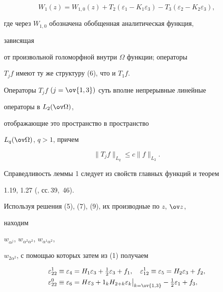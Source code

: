 \begin{equation} 


W_1(z)=W_{1,0}(z)+T_2(\varepsilon_1-K_1\varepsilon_3)-T_3 


(\varepsilon_2-K_2\varepsilon_3), 


\end{equation} 


где через $W_{1,0}$ обозначена обобщенная аналитическая функция, 


зависящая 


от произвольной голоморфной внутри $\Omega$ функции; операторы 


$T_jf$ имеют ту же структуру (6), что и $T_1f$. 


 


\begin{lem} 


Операторы $T_jf$ $(j=\ov{1,3})$ суть вполне непрерывные линейные 


операторы в $L_2(\ov\Omega)$, 


отображающие это пространство в пространство 


$L_q(\ov\Omega)$, $q>1$, причем 


$$ 


\|T_jf\|_{L_q}\le c\|f\|_{L_2}. 


$$ 


\end{lem} 


 


Справедливость леммы 1 следует из свойств главных функций и теорем 


1.19, 1.27 (\cite{3}, сс.\,39,~46). 


 


Используя решения (5), (7), (9), их производные по $z$, $\ov z$, 


находим 


$w_{\alpha^j}$, $w_{\alpha^2\alpha^2}$, $w_{\alpha^1\alpha^2}$, 


$w_{2\alpha^2}$, с помощью которых затем из (1) получаем 


\begin{equation} 


\begin{split} 


\varepsilon^1_{22}&\equiv\varepsilon_4=H_1\varepsilon_3+ 


\tfrac{1}{2}\varepsilon_3+f_1,\quad 


\varepsilon^1_{12}\equiv\varepsilon_5=H_2\varepsilon_3+f_2, \\ 


\varepsilon^0_{22}&\equiv\varepsilon_6=H\varepsilon_3+ 


1_kH_{2+k}\varepsilon_k\big|_{k=\ov{1,3}}-\tfrac{1}{2} 


\varepsilon_1+f_3, 


\end{split} 


\end{equation} 


